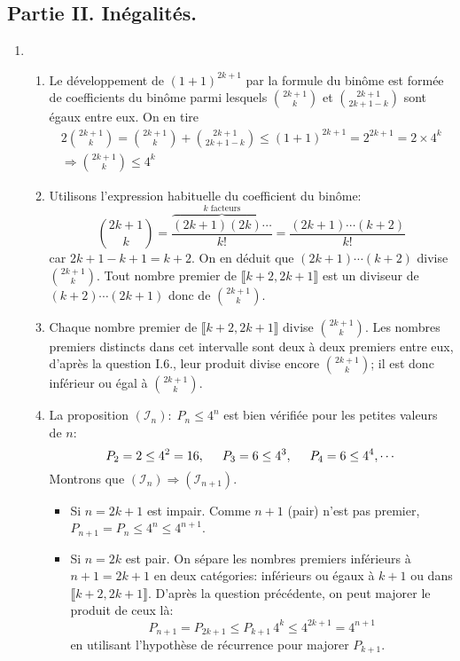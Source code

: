\subsection*{Partie II. Inégalités.}
\begin{enumerate}
  \item 
\begin{enumerate}
\item Le développement de $(1+1)^{2k+1}$ par la formule du binôme est formée de coefficients du binôme parmi lesquels $\binom{2k+1}{k}$ et $\binom{2k+1}{2k+1 -k}$ sont égaux entre eux. On en tire
\begin{multline*}
2 \binom{2k+1}{k} = \binom{2k+1}{k} + \binom{2k+1}{2k+1-k} \leq (1+1)^{2k+1} = 2^{2k+1} = 2\times 4^k \\
\Rightarrow \binom{2k+1}{k} \leq 4^k
\end{multline*}

\item Utilisons l'expression habituelle du coefficient du binôme:
\begin{displaymath}
\binom{2k+1}{k} = \frac{\overset{k \text{ facteurs}}{\overbrace{(2k+1)(2k)\cdots}}}{k!}
= \frac{(2k+1)\cdots(k+2)}{k!}
\end{displaymath}
car $2k+1 -k +1 = k+2$. On en déduit que $(2k+1)\cdots(k+2)$ divise $\binom{2k+1}{k}$.\newline
Tout nombre premier de $\llbracket k+2, 2k+1 \rrbracket$ est un diviseur de $(k+2)\cdots(2k+1)$ donc de $\binom{2k+1}{k}$. 

\item Chaque nombre premier de $\llbracket k+2, 2k+1 \rrbracket$ divise $\binom{2k+1}{k}$. Les nombres premiers distincts dans cet intervalle sont deux à deux premiers entre eux, d'après la question I.6., leur produit divise encore $\binom{2k+1}{k}$; il est donc inférieur ou égal à $\binom{2k+1}{k}$.

\item La proposition $(\mathcal{I}_n):\; P_n \leq 4^n$ est bien vérifiée pour les petites valeurs de $n$:
\begin{displaymath}
  P_2 = 2 \leq 4^2 = 16, \hspace{0.5cm} P_3 = 6 \leq 4^3, \hspace{0.5cm} P_4 = 6 \leq 4^4, \cdots
\end{displaymath}
Montrons que $(\mathcal{I}_n) \Rightarrow (\mathcal{I}_{n+1})$.
\begin{itemize}
  \item Si $n=2k+1$ est impair. Comme $n+1$ (pair) n'est pas premier, $P_{n+1} = P_n \leq 4^n \leq 4^{n+1}$.
  \item Si $n=2k$ est pair. On sépare les nombres premiers inférieurs à $n+1=2k+1$ en deux catégories: inférieurs ou égaux à $k+1$ ou dans $\llbracket k+2, 2k+1\rrbracket$. D'après la question précédente, on peut majorer le produit de ceux là:
\begin{displaymath}
P_{n+1} = P_{2k+1} \leq P_{k+1} \, 4^{k} \leq 4^{2k+1} = 4^{n+1}  
\end{displaymath}
en utilisant l'hypothèse de récurrence pour majorer $P_{k+1}$.
\end{itemize}


\end{enumerate}
\end{enumerate}
